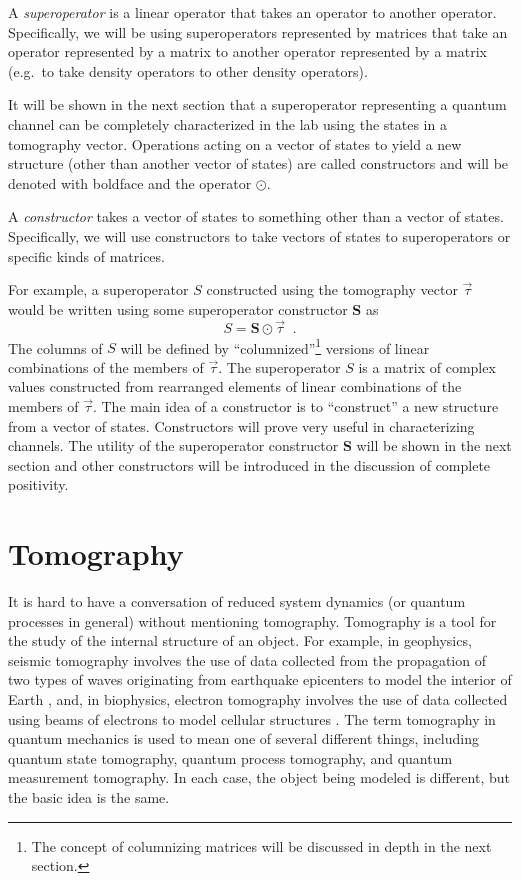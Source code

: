 \begin{definition}
A {\em superoperator} is a linear operator that takes an operator to another operator.  Specifically, we will be using superoperators represented by matrices that take an operator represented by a matrix to another operator represented by a matrix (e.g.\ to take density operators to other density operators).
\end{definition}

It will be shown in the next section that a superoperator representing a quantum channel can be completely characterized in the lab using the states in a tomography vector.  Operations acting on a vector of states to yield a new structure (other than another vector of states) are called constructors and will be denoted with boldface and the operator $\odot$.  
\begin{definition}
A {\em constructor} takes a vector of states to something other than a vector of states.  Specifically, we will use constructors to take vectors of states to superoperators or specific kinds of matrices.
\end{definition}

For example, a superoperator $S$ constructed using the tomography vector $\vec{\tau}$ would be written using some superoperator constructor $\mathbf{S}$ as
$$
S = \mathbf{S}\odot \vec{\tau}\;\;.
$$
The columns of $S$ will be defined by ``columnized''\footnote{The concept of columnizing matrices will be discussed in depth in the next section.} versions of linear combinations of the members of $\vec{\tau}$.  The superoperator $S$ is a matrix of complex values constructed from rearranged elements of linear combinations of the members of $\vec{\tau}$.  The main idea of a constructor is to ``construct'' a new structure from a vector of states.  Constructors will prove very useful in characterizing channels.  The utility of the superoperator constructor $\mathbf{S}$ will be shown in the next section and other constructors will be introduced in the discussion of complete positivity.

\chapter{Tomography}
\label{sec:tomo}

It is hard to have a conversation of reduced system dynamics (or quantum processes in general) without mentioning tomography.  Tomography is a tool for the study of the internal structure of an object.  For example, in geophysics, seismic tomography involves the use of data collected from the propagation of two types of waves originating from earthquake epicenters to model the interior of Earth \cite{Lo1994}, and, in biophysics, electron tomography involves the use of data collected using beams of electrons to model cellular structures \cite{Frank2006}.  The term tomography in quantum mechanics is used to mean one of several different things, including quantum state tomography, quantum process tomography, and quantum measurement tomography.  In each case, the object being modeled is different, but the basic idea is the same.

